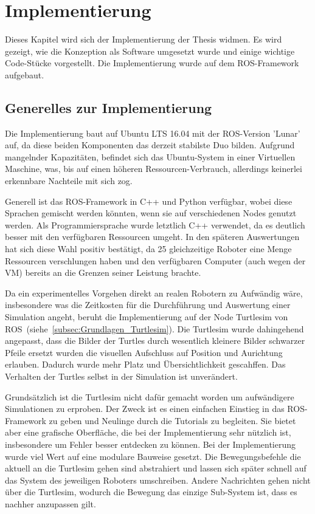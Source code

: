 \chapter{Implementierung}\label{ch:Implementierung}

Dieses Kapitel wird sich der Implementierung der Thesis widmen. Es wird gezeigt, wie die Konzeption als Software umgesetzt wurde und einige wichtige Code-Stücke vorgestellt. Die Implementierung wurde auf dem \ac{ROS}-Framework aufgebaut.

\section{Generelles zur Implementierung}
Die Implementierung baut auf Ubuntu LTS 16.04 mit der \ac{ROS}-Version 'Lunar' auf, da diese beiden Komponenten das derzeit stabilste Duo bilden. Aufgrund mangelnder Kapazitäten, befindet sich das Ubuntu-System in einer Virtuellen Maschine, was, bis auf einen höheren Ressourcen-Verbrauch, allerdings keinerlei erkennbare Nachteile mit sich zog.

Generell ist das \ac{ROS}-Framework in C++ und Python verfügbar, wobei diese Sprachen gemischt werden könnten, wenn sie auf verschiedenen Nodes genutzt werden. Als Programmiersprache wurde letztlich C++ verwendet, da es deutlich besser mit den verfügbaren Ressourcen umgeht. In den späteren Auswertungen hat sich diese Wahl positiv bestätigt, da 25 gleichzeitige Roboter eine Menge Ressourcen verschlungen haben und den verfügbaren Computer (auch wegen der VM) bereits an die Grenzen seiner Leistung brachte.

Da ein experimentelles Vorgehen direkt an realen Robotern zu Aufwändig wäre, insbesondere was die Zeitkosten für die Durchführung und Auswertung einer Simulation angeht, beruht die Implementierung auf der Node Turtlesim\cite{ROS_TURTLESIM} von ROS~(siehe~\autoref{subsec:Grundlagen_Turtlesim}). Die Turtlesim wurde dahingehend angepasst, dass die Bilder der Turtles durch wesentlich kleinere Bilder schwarzer Pfeile ersetzt wurden die visuellen Aufschluss auf Position und Aurichtung erlauben. Dadurch wurde mehr Platz und Übersichtlichkeit gescahffen. Das Verhalten der Turtles selbst in der Simulation ist unverändert.

Grundsätzlich ist die Turtlesim nicht dafür gemacht worden um aufwändigere Simulationen zu erproben. Der Zweck ist es einen einfachen Einstieg in das \ac{ROS}-Framework zu geben und Neulinge durch die Tutorials zu begleiten. Sie bietet aber eine grafische Oberfläche, die bei der Implementierung sehr nützlich ist, insbesondere um Fehler besser entdecken zu können.
Bei der Implementierung wurde viel Wert auf eine modulare Bauweise gesetzt. Die Bewegungsbefehle die aktuell an die Turtlesim gehen sind abstrahiert und lassen sich später schnell auf das System des jeweiligen Roboters umschreiben. Andere Nachrichten gehen nicht über die Turtlesim, wodurch die Bewegung das einzige Sub-System ist, dass es nachher anzupassen gilt.

